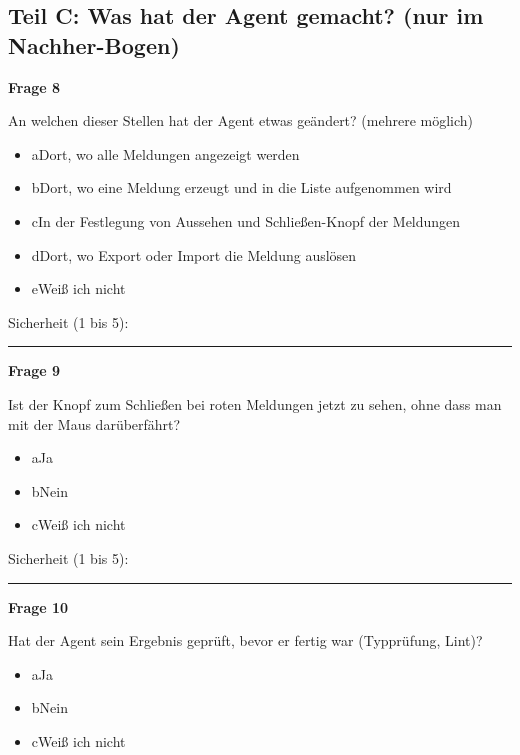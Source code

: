 \medskip

\subsection*{Teil C: Was hat der Agent gemacht? (nur im Nachher-Bogen)}

\noindent\begin{minipage}{\linewidth}
\textbf{Frage 8}\par
An welchen dieser Stellen hat der Agent etwas geändert? (mehrere möglich)

\begin{itemize}[nosep,leftmargin=2.4em]
\item[\kreuz] a\quad Dort, wo alle Meldungen angezeigt werden
\item[\kreuz] b\quad Dort, wo eine Meldung erzeugt und in die Liste aufgenommen wird
\item[\kreuz] c\quad In der Festlegung von Aussehen und Schließen-Knopf der Meldungen
\item[\kreuz] d\quad Dort, wo Export oder Import die Meldung auslösen
\item[\kreuz] e\quad Weiß ich nicht
\end{itemize}
\noindent Sicherheit (1 bis 5):~\rule{2.5em}{0.4pt}\par
\end{minipage}

\medskip

\noindent\begin{minipage}{\linewidth}
\textbf{Frage 9}\par
Ist der Knopf zum Schließen bei roten Meldungen jetzt zu sehen, ohne dass man mit der Maus darüberfährt?

\begin{itemize}[nosep,leftmargin=2.4em]
\item[\kreuz] a\quad Ja
\item[\kreuz] b\quad Nein
\item[\kreuz] c\quad Weiß ich nicht
\end{itemize}
\noindent Sicherheit (1 bis 5):~\rule{2.5em}{0.4pt}\par
\end{minipage}

\medskip

\noindent\begin{minipage}{\linewidth}
\textbf{Frage 10}\par
Hat der Agent sein Ergebnis geprüft, bevor er fertig war (Typprüfung, Lint)?

\begin{itemize}[nosep,leftmargin=2.4em]
\item[\kreuz] a\quad Ja
\item[\kreuz] b\quad Nein
\item[\kreuz] c\quad Weiß ich nicht
\end{itemize}
\end{minipage}


